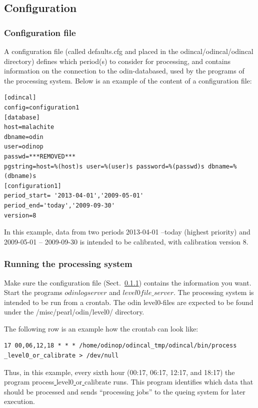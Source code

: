 \documentclass[12pt]{article}
\begin{document}
\subsection{Configuration}
\subsubsection{Configuration file}
\label{sec:config}
A configuration file (called defaults.cfg and placed
in the odincal/odincal/odincal directory) defines which period(s) to consider
for processing, and contains information on the connection
to the odin-databased, used by the programs of the processing system.
Below is an example of the content of a configuration file:
\begin{verbatim}
[odincal]
config=configuration1
[database]
host=malachite
dbname=odin
user=odinop
passwd=***REMOVED***
pgstring=host=%(host)s user=%(user)s password=%(passwd)s dbname=%(dbname)s
[configuration1]
period_start= '2013-04-01','2009-05-01'
period_end='today','2009-09-30'
version=8
\end{verbatim}
In this example, data from two periods 2013-04-01 --today (highest priority)
and 2009-05-01 -- 2009-09-30
is intended to be calibrated, with calibration version 8.

\subsubsection{Running the processing system}
Make sure the configuration file (Sect.~\ref{sec:config}) contains
the information you want.  
Start the programs \(odinlogserver\) and \(level0file\_server\).
The processing system is intended to be run from a crontab.
The odin level0-files are expected to be found
under the /misc/pearl/odin/level0/ directory.

The following row is an example how the crontab can look like: 
\begin{verbatim}
17 00,06,12,18 * * * /home/odinop/odincal_tmp/odincal/bin/process
_level0_or_calibrate > /dev/null
\end{verbatim}
Thus, in this example, every sixth hour (00:17, 06:17, 12:17, and 18:17)
the program process\underline{ }level0\underline{ }or\underline{ }calibrate
runs. This program identifies which data that should be processed
and sends ``processing jobs'' to the queing system for later execution.
\end{document}
